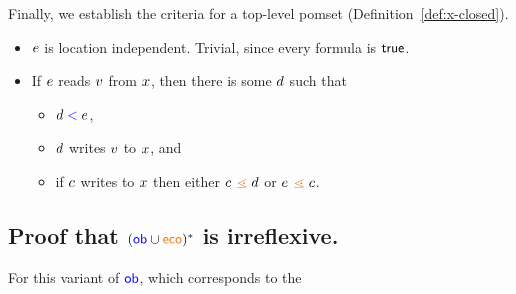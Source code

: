 Finally, we establish the criteria for a top-level pomset
(Definition~\ref{def:x-closed}).
\begin{itemize}
\item $e$ is location independent. Trivial, since every formula is $\mathsf{true}$.
\item If $e$ reads $v$ from $x$, then there is some $d$ such that
  \begin{itemize}
  \item $d \mathrel{{\color{blue}<}} e$,  
  \item $d$ writes $v$ to $x$, and
  \item if $c$ writes to $x$
    then either $\cEv \gtN \bEv$ or $\aEv \gtN \cEv$.
  \end{itemize}    
\end{itemize}

\subsection{Proof that  $({\rob} \cup {\reco})^*$ is irreflexive. }


For this variant of $\mathrel{\color{blue}\mathsf{ob}}$, which corresponds to the 

